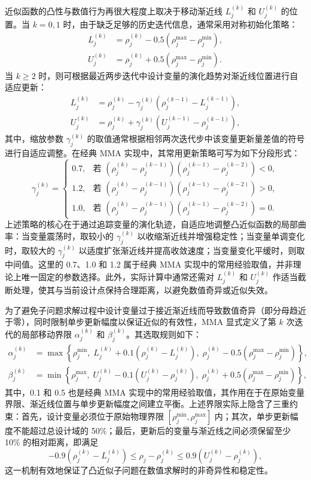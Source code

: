 近似函数的凸性与数值行为再很大程度上取决于移动渐近线 $L_j^{(k)}$ 和 $U_j^{(k)}$ 的位置。当 $k=0,1$ 时，由于缺乏足够的历史迭代信息，通常采用对称初始化策略：
\[
\begin{aligned} 
	L_j^{(k)} &= \rho_j^{(k)} - 0.5(\rho_j^{\max}-\rho_j^{\min}),\\ 
	U_j^{(k)} &= \rho_j^{(k)} + 0.5(\rho_j^{\max}-\rho_j^{\min}). 
\end{aligned}
\]
当 $k\ge 2$ 时，则可根据最近两步迭代中设计变量的演化趋势对渐近线位置进行自适应更新：
\[
\begin{aligned} 
	L_j^{(k)} &= \rho_j^{(k)} - \gamma_j^{(k)}(\rho_j^{(k-1)}-L_j^{(k-1)}),\\ 
	U_j^{(k)} &= \rho_j^{(k)} + \gamma_j^{(k)}(U_j^{(k-1)}-\rho_j^{(k-1)}),
\end{aligned}
\]
其中，缩放参数 $\gamma_j^{(k)}$ 的取值通常根据相邻两次迭代步中该变量更新量差值的符号进行自适应调整。在经典 MMA 实现中，其常用更新策略可写为如下分段形式：
\[
\gamma_j^{(k)} = 
\begin{cases} 
	0.7, & \text{若 } (\rho_j^{(k)}-\rho_j^{(k-1)})(\rho_j^{(k-1)}-\rho_j^{(k-2)}) < 0, \\ 
	1.2, & \text{若 } (\rho_j^{(k)}-\rho_j^{(k-1)})(\rho_j^{(k-1)}-\rho_j^{(k-2)}) > 0, \\ 
	1.0, & \text{若 } (\rho_j^{(k)}-\rho_j^{(k-1)})(\rho_j^{(k-1)}-\rho_j^{(k-2)}) = 0.
\end{cases}
\]
上述策略的核心在于通过追踪变量的演化轨迹，自适应地调整凸近似函数的局部曲率：当变量震荡时，取较小的 $\gamma_j^{(k)}$ 以收缩渐近线并增强稳定性；当变量单调变化时，取较大的 $\gamma_j^{(k)}$ 以适度扩张渐近线并提高收敛速度；当变量变化平缓时，则取中间值。这里的 0.7、1.0 和 1.2 属于经典 MMA 实现中的常用经验取值，并非理论上唯一固定的参数选择。此外，实际计算中通常还需对 $L_j^{(k)}$ 和 $U_j^{(k)}$ 作适当截断处理，使其与当前设计点保持合理距离，以避免数值奇异或近似失效。

为了避免子问题求解过程中设计变量过于接近渐近线而导致数值奇异（即分母趋近于零），同时限制单步更新幅度以保证近似的有效性，MMA 显式定义了第 $k$ 次迭代的局部移动界限 $\alpha_j^{(k)}$ 和 $\beta_j^{(k)}$。其选取规则如下：
\[
\begin{aligned} 
	\alpha_j^{(k)} &= \max\left\{ \rho_j^{\min},\; L_j^{(k)} + 0.1(\rho_j^{(k)} - L_j^{(k)}),\; \rho_j^{(k)} - 0.5(\rho_j^{\max} - \rho_j^{\min}) \right\},\\ 
	\beta_j^{(k)} &= \min\left\{ \rho_j^{\max},\; U_j^{(k)} - 0.1(U_j^{(k)} - \rho_j^{(k)}),\; \rho_j^{(k)} + 0.5(\rho_j^{\max} - \rho_j^{\min}) \right\}, 
\end{aligned}
\]
其中，0.1 和 0.5 也是经典 MMA 实现中的常用经验取值，其作用在于在原始变量界限、渐近线位置与单步更新幅度之间建立平衡。上述界限实际上隐含了三重约束：首先，设计变量必须位于原始物理界限 $[\rho_j^{\min}, \rho_j^{\max}]$ 内；其次，单步更新幅度不能超过总设计域的 50\%；最后，更新后的变量与渐近线之间必须保留至少 10\% 的相对距离，即满足
\[
-0.9(\rho_j^{(k)} - L_j^{(k)}) \leq \rho_j - \rho_j^{(k)} \leq 0.9(U_j^{(k)} - \rho_j^{(k)}),
\]
这一机制有效地保证了凸近似子问题在数值求解时的非奇异性和稳定性。

